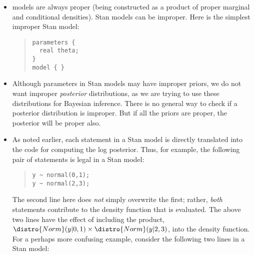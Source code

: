 \begin{itemize}
\item \BUGS models are always proper (being constructed as a product
  of proper marginal and conditional densities).  Stan models can be
  improper.  Here is the simplest improper Stan model: 
\begin{quote}
\begin{Verbatim}[fontsize=\small]
parameters {
  real theta;
} 
model { }
\end{Verbatim}
\end{quote}
\item Although parameters in Stan models may have improper priors, we
  do not want improper \emph{posterior} distributions, as we are trying to
  use these distributions for Bayesian inference.  There is no general
  way to check if a posterior distribution is improper.  But if all
  the priors are proper, the posterior will be proper also.
\item
  As noted earlier, each statement in a Stan model is directly translated into the \Cpp code for computing the log posterior.  Thus, for example, the following pair of statements is legal in a Stan model:
\begin{quote}
\begin{Verbatim}[fontsize=\small]
y ~ normal(0,1);
y ~ normal(2,3);
\end{Verbatim}
\end{quote}
%
The second line here does \emph{not} simply overwrite the first;
rather, \emph{both} statements contribute to the density function that
is evaluated.  The above two lines have the effect of including the
product, $\distro{Norm}(y|0,1) \times \distro{Norm}(y|2,3)$, into the
density function.
\\[6pt] 
For a perhaps more confusing example, consider the following two lines in a Stan model:
\begin{quote}
\begin{Verbatim}[fontsize=\small]

\end{Verbatim}
\end{quote}
\end{itemize}
